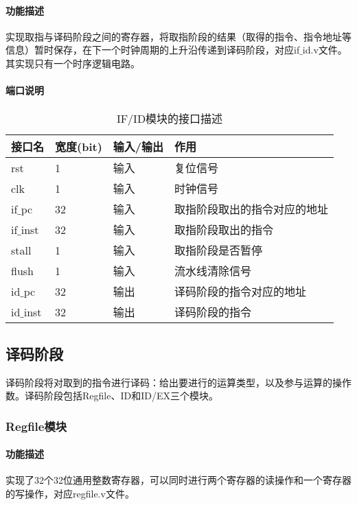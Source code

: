 \paragraph{功能描述}
\quad

\quad

实现取指与译码阶段之间的寄存器，将取指阶段的结果（取得的指令、指令地址等信息）暂时保存，在下一个时钟周期的上升沿传递到译码阶段，对应if$\_$id.v文件。其实现只有一个时序逻辑电路。
\paragraph{端口说明}
\quad

\quad
\begin{table}[H]
	\centering
	\caption{IF/ID模块的接口描述}
	\begin{tabular}{|l|l|l|l|}
		\hline
		接口名 & 宽度(bit) & 输入/输出 & 作用 \\
		\hline
		rst & 1 & 输入 & 复位信号 \\
		\hline
		clk & 1 & 输入 & 时钟信号 \\
		\hline
		if$\_$pc & 32 & 输入 & 取指阶段取出的指令对应的地址 \\
		\hline
		if$\_$inst & 32 & 输入 & 取指阶段取出的指令 \\
		\hline
		stall & 1 & 输入 & 取指阶段是否暂停 \\
		\hline
		flush & 1 & 输入 & 流水线清除信号 \\
		\hline
		id$\_$pc & 32 & 输出 & 译码阶段的指令对应的地址 \\
		\hline
		id$\_$inst & 32 & 输出 & 译码阶段的指令 \\
		\hline
	\end{tabular}
\end{table}
\subsection{译码阶段}
译码阶段将对取到的指令进行译码：给出要进行的运算类型，以及参与运算的操作数。译码阶段包括Regfile、ID和ID/EX三个模块。
\subsubsection{Regfile模块}
\paragraph{功能描述}
\quad

\quad

实现了32个32位通用整数寄存器，可以同时进行两个寄存器的读操作和一个寄存器的写操作，对应regfile.v文件。

